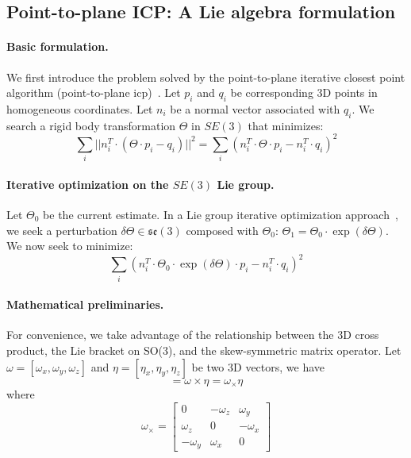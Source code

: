\subsection{Point-to-plane ICP: A Lie algebra formulation}
\label{in:sec:p2plane}

\paragraph{Basic formulation.}
We first introduce the problem solved by the point-to-plane iterative closest point algorithm (point-to-plane \acrshort{icp})~\cite{Rusinkiewicz:IC3DIM:2001}.
Let $p_i$ and $q_i$ be corresponding 3D points in homogeneous coordinates. Let $n_i$ be a normal vector associated with $q_i$. We search a rigid body transformation $\Theta$ in $SE(3)$ that minimizes:
\begin{equation}
\sum_i ||n_i^T \cdot (\Theta \cdot p_i - q_i)||^2 = \sum_i (n_i^T \cdot \Theta \cdot p_i - n_i^T \cdot q_i)^2
\end{equation}

\paragraph{Iterative optimization on the $SE(3)$ Lie group.}
Let $\Theta_0$ be the current estimate. In a Lie group iterative optimization approach~\cite{Mahony:JGO:2002,Vercauteren:IPMI:2007}, we seek a perturbation $\delta\Theta \in \mathfrak{se}(3)$ composed with
$\Theta_0$: $\Theta_1 = \Theta_0 \cdot \exp(\delta\Theta)$. We now seek to minimize:
\begin{equation}
\sum_i (n_i^T \cdot \Theta_0 \cdot \exp(\delta\Theta) \cdot p_i - n_i^T \cdot q_i)^2
\end{equation}

\paragraph{Mathematical preliminaries.}
For convenience, we take advantage of the relationship between the 3D cross product, the Lie bracket on SO(3), and the skew-symmetric matrix operator.
Let $\omega = [\omega_x, \omega_y, \omega_z]$ and $\eta = [\eta_x, \eta_y, \eta_z]$ be two 3D vectors, we have
\begin{equation}
[\omega, \eta] = \omega \times \eta = \omega_\times \eta
\end{equation}
where
\begin{equation}
\omega_\times =
\begin{bmatrix}
0         & -\omega_z & \omega_y \\
\omega_z  & 0         & -\omega_x \\
-\omega_y & \omega_x  & 0
\end{bmatrix}
\end{equation}

